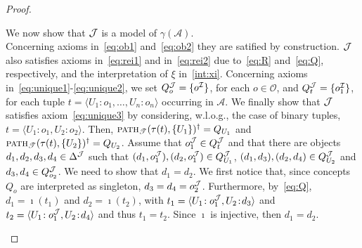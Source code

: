 \documentclass[envcountsame,draft]{llncs}
\newcommand{\pth}[2]{\ensuremath{\textsc{path}_{\mathscr{T}}(#1,#2)}\xspace}
\newcommand{\A}{\ensuremath{\mathcal{A}}\xspace}
\newcommand{\Ob}{\ensuremath{\mathcal{O}}\xspace}
\begin{document}
\begin{proof}
\begin{enumerate}
  \smallskip
  We now show that $\mathcal{J}$ is a model of $\gamma(\A)$.\\
  Concerning axioms in~\eqref{eq:ob1} and~\eqref{eq:ob2} they are
  satified by construction. $\mathcal{J}$ also satisfies axioms
  in~\eqref{eq:rei1} and in~\eqref{eq:rei2} due to~\eqref{eq:R}
  and~\eqref{eq:Q}, respectively, and the interpretation of $\xi$
  in~\eqref{int:xi}. Concerning axioms
  in~\eqref{eq:unique1}-\eqref{eq:unique2}, we set
  $Q_o^\mathcal{J} = \{o^\mathcal{I}\}$, for each $o\in\Ob$, and
  $Q_t^\mathcal{J} = \{o_1^\mathcal{I}\}$, for each tuple
  $t = \langle U_1\!:o_1,\ldots,U_n\!:\!o_n\rangle$ occurring in
  $\A$. We finally show that $\mathcal{J}$ satisfies axiom~\eqref{eq:unique3}
  by considering, w.l.o.g., the case of binary tuples,
  $t = \langle U_1\!:\!o_1, U_2\!:\!o_2\rangle$. Then,
  $\pth{\tau(t)}{\{U_1\}}^\dag = Q_{U_1}$ and
  $\pth{\tau(t)}{\{U_2\}}^\dag = Q_{U_2}$. Assume that
  $o_1^\mathcal{J}\in Q_t^\mathcal{J}$ and that there are objects
  $d_1, d_2, d_3, d_4\in \Delta^\mathcal{J}$ such that
  $(d_1,o_1^\mathcal{J}), (d_2,o_1^\mathcal{J})\in Q_{U_1}^\mathcal{J}$,
  $(d_1,d_3), (d_2,d_4)\in Q_{U_2}^\mathcal{J}$ and
  $d_3, d_4\in Q_{o_2}^\mathcal{J}$. We need to show that $d_1 = d_2$. We
  first notice that, since concepts $Q_o$ are interpreted as
  singleton, $d_3 = d_4 = o_2^\mathcal{J}$. Furthermore, by~\eqref{eq:Q},
  $d_1 = \imath(t_1)$ and $d_2 = \imath(t_2)$, with $t_1 = \langle
  U_1\!:o_1^\mathcal{J}, U_2\!:\!d_3\rangle$ and $t_2 = \langle
  U_1\!:o_1^\mathcal{J}, U_2\!:\!d_4\rangle$ and thus $t_1 = t_2$. Since
  $\imath$ is injective, then $d_1 = d_2$.
\end{enumerate}

\smallskip


\end{proof}
\end{document}
